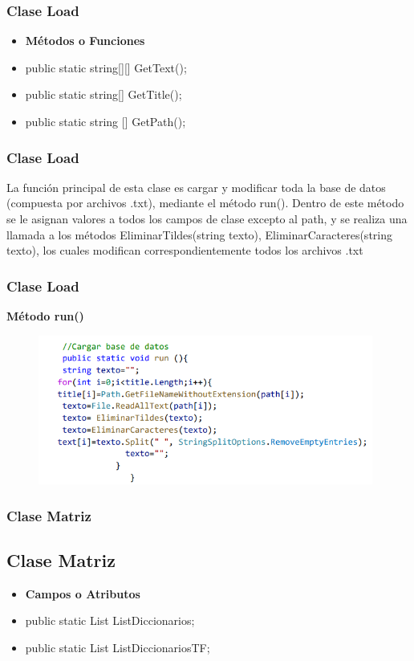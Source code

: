 \documentclass[17pt]{beamer}
\begin{document}
 \begin{frame}
    \frametitle{Clase Load}
    \begin{itemize}
        \item[] \textbf{Métodos o Funciones}
    \item public static string[][] GetText();
    \item public static string[] GetTitle();
    \item public static string [] GetPath();
    \end{itemize}
 \end{frame}
 \begin{frame}
    \frametitle{Clase Load}
    \begin{footnotesize}
        \fontsize{12}{10}
        La función principal de esta clase es cargar y modificar toda la base de
        datos (compuesta por archivos .txt), mediante el método run().
        \linebreak
        Dentro de este método se le asignan valores a todos los campos de clase excepto al
        path, y se realiza una llamada a los métodos EliminarTildes(string texto),
        EliminarCaracteres(string texto), los cuales modifican correspondientemente
        todos los archivos .txt  
    \end{footnotesize}
  \end{frame}
  \begin{frame}
    \frametitle{Clase Load}
    \textbf{Método run()}
    \begin{figure}[h]
    \includegraphics[width=11cm]{Code 1.png}
    \end{figure}
   \end{frame}
   \begin{frame}
    \frametitle{Clase Matriz}
    \subsection*{Clase Matriz}
    \begin{itemize}
        \item[] \textbf{Campos o Atributos}
        \item public static List ListDiccionarios;
        \item public static List ListDiccionariosTF;
        \end{itemize}
   \end{frame}
\end{document}
